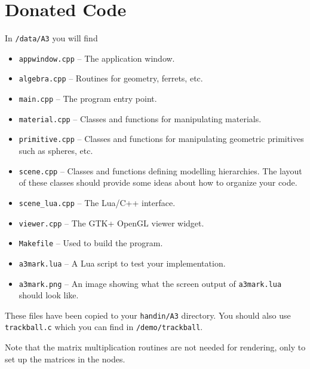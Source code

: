 \section{Donated Code}
In \texttt{\CourseData/data/A3} you will find
\begin{itemize}
\item {\tt appwindow.cpp} -- The application window.
\item {\tt algebra.cpp} -- Routines for geometry, ferrets, etc.
\item {\tt main.cpp} -- The program entry point.
\item {\tt material.cpp} -- Classes and functions for manipulating
  materials.
\item {\tt primitive.cpp} -- Classes and functions for manipulating
  geometric primitives such as spheres, etc.
\item {\tt scene.cpp} -- Classes and functions defining modelling
  hierarchies.  The layout of these classes should provide
  some ideas about how to organize your code.
\item {\tt scene\_lua.cpp} -- The Lua/C++ interface.
\item {\tt viewer.cpp} -- The GTK+ OpenGL viewer widget.
\item {\tt Makefile} -- Used to build the program.
\item {\tt a3mark.lua} -- A Lua script to test your implementation.
\item {\tt a3mark.png} -- An image showing what the screen output
  of {\tt a3mark.lua} should look like.
\end{itemize}
These files have been copied to your \texttt{handin/A3} directory.
You should also use {\tt trackball.c} which you can find
in {\tt \CourseData/demo/trackball}.

Note that the matrix multiplication routines are not needed for rendering,
only to set up the matrices in the nodes.

